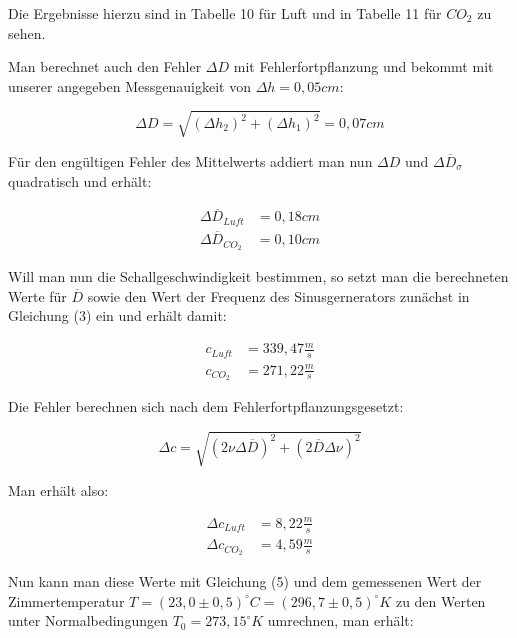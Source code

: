 \documentclass{article}
\begin{document}
Die Ergebnisse hierzu sind in Tabelle 10 für Luft und in Tabelle 11 für $CO_2$ zu sehen.

Man berechnet auch den Fehler $\Delta D$ mit Fehlerfortpflanzung und bekommt mit unserer angegeben Messgenauigkeit von $\Delta h = 0,05cm$:

\begin{equation}
    \Delta D = \sqrt{(\Delta h_2)^2+(\Delta h_1)^2} = 0,07cm
\end{equation}

Für den engültigen Fehler des Mittelwerts addiert man nun $\Delta D$ und $\Delta \overline{D}_{\sigma}$ quadratisch und erhält:

\begin{equation}
    \begin{split}
        \Delta \overline{D}_{Luft} &= 0,18cm \\
        \Delta \overline{D}_{CO_2} &= 0,10cm
    \end{split}
\end{equation}

Will man nun die Schallgeschwindigkeit bestimmen, so setzt man die berechneten Werte für $\overline{D}$ sowie den Wert der Frequenz des Sinusgernerators zunächst in Gleichung (3) ein und erhält damit:

\begin{equation}
\begin{split}
    c_{Luft} &= 339,47 \frac{m}{s} \\
    c_{CO_2} &= 271,22 \frac{m}{s}
\end{split}
\end{equation}

Die Fehler berechnen sich nach dem Fehlerfortpflanzungsgesetzt:

\begin{equation}
    \Delta c = \sqrt{(2 \nu \Delta \overline{D})^2 + (2 \overline{D} \Delta \nu )^2}
\end{equation}

Man erhält also:

\begin{equation}
    \begin{split}
        \Delta c_{Luft} &= 8,22 \frac{m}{s} \\
        \Delta c_{CO_2} &= 4,59 \frac{m}{s}
    \end{split}
\end{equation}

Nun kann man diese Werte mit Gleichung (5) und dem gemessenen Wert der Zimmertemperatur $T = (23,0 \pm 0,5)^{\circ}C = (296,7 \pm 0,5)^{\circ}K$ zu den Werten unter Normalbedingungen $T_0 = 273,15^{\circ}K$ umrechnen, man erhält:
\end{document}
